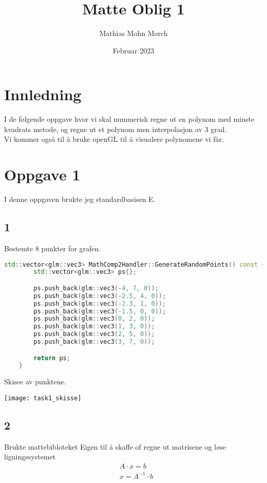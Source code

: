 ﻿\documentclass[14]{article}
\title{Matte Oblig 1}
\author{Mathias Mohn Mørch}
\date{Februar 2023}
\begin{document}
    \maketitle
    \begin{flushleft}
        \graphicspath{{Images/}}

        \section{Innledning}
        I de følgende oppgave hvor vi skal nummerisk regne ut en polynom med minste kvadrats metode, 
        og regne ut et polynom men interpolasjon av 3 grad. \\
        Vi kommer også til å bruke openGL til å visualere polynomene vi får.
        

        \section{Oppgave 1}
        I denne oppgaven brukte jeg standardbasisen E.
        
        \subsection*{1}
        Bestemte 8 punkter for grafen.

        \begin{lstlisting}[language=C++, caption=C++ example]
    std::vector<glm::vec3> MathComp2Handler::GenerateRandomPoints() const {
        std::vector<glm::vec3> ps{};

        ps.push_back(glm::vec3(-4, 7, 0));
        ps.push_back(glm::vec3(-2.5, 4, 0));
        ps.push_back(glm::vec3(-2.3, 1, 0));
        ps.push_back(glm::vec3(-1.5, 0, 0));
        ps.push_back(glm::vec3(0, 2, 0));
        ps.push_back(glm::vec3(1, 3, 0));
        ps.push_back(glm::vec3(2, 5, 0));
        ps.push_back(glm::vec3(3, 7, 0));

        return ps;
    }
        \end{lstlisting}
        
        Skisee av punktene.

        \texttt{[image: task1\_skisse]}
        
        
        
        \subsection*{2}
        Brukte mattebibloteket Eigen til å skaffe of regne ut matrisene og løse ligningssystemet 
        \begin{align*}
            & A\cdot x = b \\
            & x = A^{-1} \cdot b
        \end{align*}
        

\end{flushleft}
\end{document}

